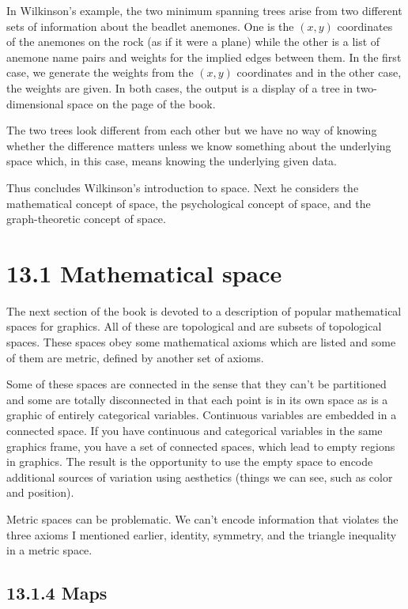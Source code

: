 In Wilkinson's example, the two minimum spanning trees arise from two
different sets of information about the beadlet anemones. One is the
\((x,y)\) coordinates of the anemones on the rock (as if it were a
plane) while the other is a list of anemone name pairs and weights for
the implied edges between them. In the first case, we generate the
weights from the \((x,y)\) coordinates and in the other case, the
weights are given. In both cases, the output is a display of a tree in
two-dimensional space on the page of the book.

The two trees look different from each other but we have no way of
knowing whether the difference matters unless we know something about
the underlying space which, in this case, means knowing the underlying
given data.

Thus concludes Wilkinson's introduction to space. Next he considers the
mathematical concept of space, the psychological concept of space, and
the graph-theoretic concept of space.

\hypertarget{mathematical-space}{%
\section{13.1 Mathematical space}\label{mathematical-space}}

The next section of the book is devoted to a description of popular
mathematical spaces for graphics. All of these are topological and are
subsets of topological spaces. These spaces obey some mathematical
axioms which are listed and some of them are metric, defined by another
set of axioms.

Some of these spaces are connected in the sense that they can't be
partitioned and some are totally disconnected in that each point is in
its own space as is a graphic of entirely categorical variables.
Continuous variables are embedded in a connected space. If you have
continuous and categorical variables in the same graphics frame, you
have a set of connected spaces, which lead to empty regions in graphics.
The result is the opportunity to use the empty space to encode
additional sources of variation using aesthetics (things we can see,
such as color and position).

Metric spaces can be problematic. We can't encode information that
violates the three axioms I mentioned earlier, identity, symmetry, and
the triangle inequality in a metric space.

\hypertarget{maps}{%
\subsection{13.1.4 Maps}\label{maps}}

